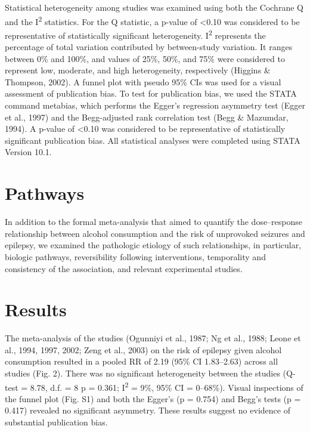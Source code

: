 \documentclass{article}
\begin{document}
Statistical heterogeneity among studies was examined using both the Cochrane Q and the I\textsuperscript{2} statistics. For the Q statistic, a p-value of <0.10 was considered to be representative of statistically significant heterogeneity. I\textsuperscript{2} represents the percentage of total variation contributed by between-study variation. It ranges between 0\% and 100\%, and values of 25\%, 50\%, and 75\% were considered to represent low, moderate, and high heterogeneity, respectively (Higgins \& Thompson, 2002). A funnel plot with pseudo 95\% CIs was used for a visual assessment of publication bias. To test for publication bias, we used the STATA command metabias, which performs the Egger’s regression asymmetry test (Egger et al., 1997) and the Begg-adjusted rank correlation test (Begg \& Mazumdar, 1994). A p-value of <0.10 was considered to be representative of statistically significant publication bias. All statistical analyses were completed using STATA Version 10.1.

\section{Pathways}

In addition to the formal meta-analysis that aimed to quantify the dose–response relationship between alcohol consumption and the risk of unprovoked seizures and epilepsy, we examined the pathologic etiology of such relationships, in particular, biologic pathways, reversibility following interventions, temporality and consistency of the association, and relevant experimental studies.

\section{Results}

The meta-analysis of the studies (Ogunniyi et al., 1987; Ng et al., 1988; Leone et al., 1994, 1997, 2002; Zeng et al., 2003) on the risk of epilepsy given alcohol consumption resulted in a pooled RR of 2.19 (95\% CI 1.83–2.63) across all studies (Fig. 2). There was no significant heterogeneity between the studies (Q-test = 8.78, d.f. = 8 p = 0.361; I\textsuperscript{2} = 9\%, 95\% CI = 0–68\%). Visual inspections of the funnel plot (Fig. S1) and both the Egger’s (p = 0.754) and Begg’s tests (p = 0.417) revealed no significant asymmetry. These results suggest no evidence of substantial publication bias.
\end{document}
